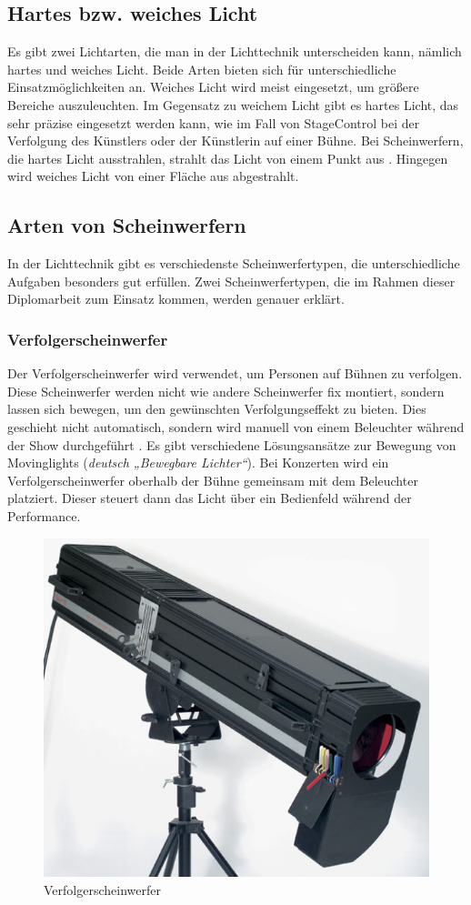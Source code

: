 \subsection{Hartes bzw. weiches Licht}
Es gibt zwei Lichtarten, die man in der Lichttechnik unterscheiden kann, nämlich hartes und weiches Licht. Beide Arten bieten sich für unterschiedliche Einsatzmöglichkeiten an. Weiches Licht wird meist eingesetzt, um größere Bereiche auszuleuchten. Im Gegensatz zu weichem Licht gibt es hartes Licht, das sehr präzise eingesetzt werden kann, wie im Fall von StageControl bei der Verfolgung des Künstlers oder der Künstlerin auf einer Bühne. Bei Scheinwerfern, die hartes Licht ausstrahlen, strahlt das Licht von einem Punkt aus \parencite{HartesWeichesLicht}. Hingegen wird weiches Licht von einer Fläche aus abgestrahlt.\\


\subsection{Arten von Scheinwerfern}
In der Lichttechnik gibt es verschiedenste Scheinwerfertypen, die unterschiedliche Aufgaben besonders gut erfüllen. Zwei Scheinwerfertypen, die im Rahmen dieser Diplomarbeit zum Einsatz kommen, werden genauer erklärt.

\newpage
\subsubsection{Verfolgerscheinwerfer}
Der Verfolgerscheinwerfer wird verwendet, um Personen auf Bühnen zu verfolgen. Diese Scheinwerfer werden nicht wie andere Scheinwerfer fix montiert, sondern lassen sich bewegen, um den gewünschten Verfolgungseffekt zu bieten. Dies geschieht nicht automatisch, sondern wird manuell von einem Beleuchter während der Show durchgeführt \parencite{Verfolgerscheinwerfer}. Es gibt verschiedene Lösungsansätze zur Bewegung von Movinglights (\textit{deutsch „Bewegbare Lichter“}).  Bei Konzerten wird ein Verfolgerscheinwerfer oberhalb der Bühne gemeinsam mit dem Beleuchter platziert. Dieser steuert dann das Licht über ein Bedienfeld während der Performance.\\


\begin{figure}[H]
	\centering
	\includegraphics[width=0.4\linewidth]{images/Verfolgerscheinwerfer.jpg}
	\caption[Verfolgerscheinwerfer]{Verfolgerscheinwerfer}
	\label{fig:Verfolgerscheinwerfer}
\end{figure}

